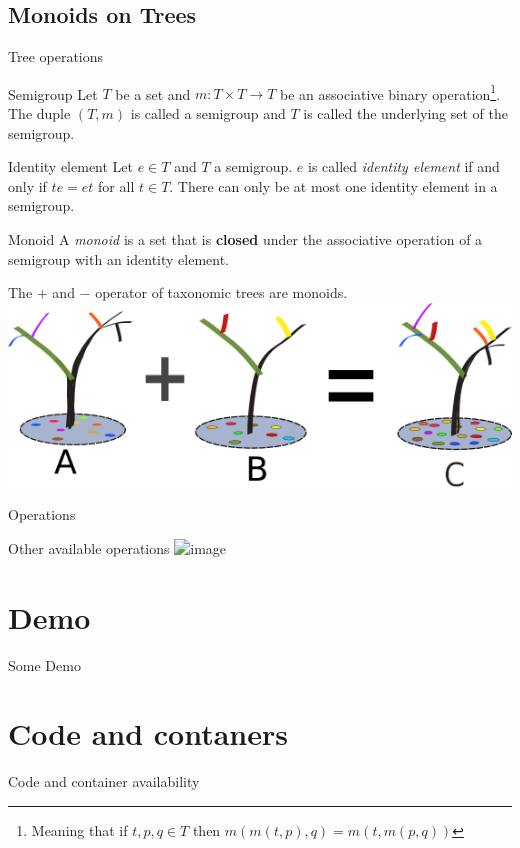 \documentclass{beamer}
\begin{document}
\subsection{Monoids on Trees}
\begin{frame}{Tree operations}
\begin{block}{Semigroup}
Let $T$ be a set and $m : T \times T \rightarrow T $ be an associative binary operation\footnote{Meaning that if $t,p,q \in T$ then $m(m(t,p),q) = m(t,m(p,q))$ }. 
The duple $(T,m)$ is called a semigroup and $T$ is called the underlying set of the semigroup.
\end{block}

\begin{block}{Identity element}
Let $e \in T$ and $T$ a semigroup. $e$ is called {\em identity element} if and only if $te = et$ for all $t \in T$. There can only be at most one identity element in a semigroup.
\end{block}
\end{frame}

\begin{frame}
\begin{block}{Monoid}
A {\em monoid} is a set that is {\bf closed} under the associative operation of a semigroup with an identity element.
	\end{block}
	The $+$ and $-$ operator of taxonomic trees are monoids.
		\centering
	\includegraphics[scale=1]{sum_monoid.png} 
\end{frame}

\begin{frame}{Operations}
	\begin{block}{Other available operations}
	\centering
	\includegraphics<1>[scale=1.5]{operators.png} 

	\end{block}
\end{frame}
\section{Demo}
\begin{frame}{Some Demo}
\begin{block}

\end{block}
\end{frame}
\section{Code and contaners}

\begin{frame}{Code and container availability}

\end{frame}
\end{document}
